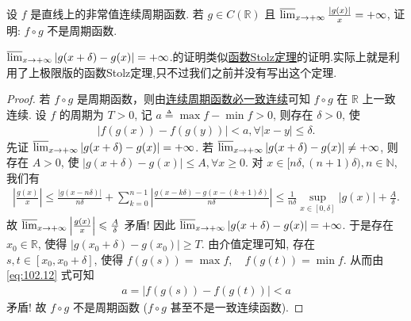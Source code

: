 \documentclass[../../main.tex]{subfiles}
\begin{document}
\begin{example}
设 $f$ 是直线上的非常值连续周期函数. 若 $g \in C(\mathbb{R})$ 且 $\varlimsup_{x \to +\infty} \frac{|g(x)|}{x} = +\infty$, 证明: $f \circ g$ 不是周期函数.
\end{example}
\begin{note}
$\varlimsup_{x \to +\infty} |g(x + \delta) - g(x)| = +\infty$.的证明类似\hyperref[theorem:函数Stolz定理]{函数Stolz定理}的证明.实际上就是利用了上极限版的函数Stolz定理,只不过我们之前并没有写出这个定理.
\end{note}
\begin{proof}
若 $f \circ g$ 是周期函数，则由\hyperref[proposition:连续周期函数必一致连续]{连续周期函数必一致连续}可知 $f \circ g$ 在 $\mathbb{R}$ 上一致连续.
设 $f$ 的周期为 $T > 0$, 记 $a \triangleq \max f - \min f > 0$, 则存在 $\delta > 0$, 使
\begin{align}
|f(g(x)) - f(g(y))| < a, \forall |x - y| \leqslant \delta. \label{eq:102.12}
\end{align}
先证 $\varlimsup_{x \to +\infty} |g(x + \delta) - g(x)| = +\infty$. 若 $\varlimsup_{x \to +\infty} |g(x + \delta) - g(x)| \ne +\infty$, 则存在 $A > 0$, 使
$|g(x + \delta) - g(x)| \leqslant A, \forall x \geqslant 0.$
对 $x \in [n\delta, (n + 1)\delta), n \in \mathbb{N}$, 我们有
\begin{align*}
\left| \frac{g(x)}{x} \right| \leqslant \frac{|g(x - n\delta)|}{n\delta} + \sum_{k=0}^{n - 1} \left| \frac{g(x - k\delta) - g(x - (k + 1)\delta)}{n\delta} \right| \leqslant \frac{1}{n\delta} \sup_{x \in [0, \delta]} |g(x)| + \frac{A}{\delta}.
\end{align*}
故 $\varlimsup_{x \to +\infty} \left| \frac{g(x)}{x} \right| \leqslant \frac{A}{\delta}$ 矛盾! 因此 $\varlimsup_{x \to +\infty} |g(x + \delta) - g(x)| = +\infty$.
于是存在 $x_0 \in \mathbb{R}$, 使得 $|g(x_0 + \delta) - g(x_0)| \geqslant T$. 由介值定理可知, 存在 $s, t \in [x_0, x_0 + \delta]$, 使得
$f(g(s)) = \max f, \quad f(g(t)) = \min f.$
从而由 \eqref{eq:102.12} 式可知
\begin{align*}
a = |f(g(s)) - f(g(t))| < a
\end{align*}
矛盾! 故 $f \circ g$ 不是周期函数 ($f \circ g$ 甚至不是一致连续函数).
\end{proof}
\end{document}
